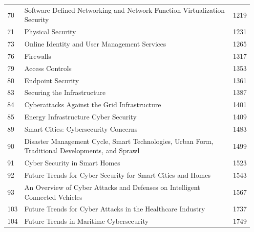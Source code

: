 \documentclass[10pt,letterpaper,oneside]{article}
\begin{document}
\begin{longtable}{@{}p{}p{}p{}@{}}
70 & Software-Defined Networking and Network Function Virtualization Security & 1219 \\
71 & Physical Security & 1231 \\
73 & Online Identity and User Management Services & 1265 \\
76 & Firewalls & 1317 \\
79 & Access Controls & 1353 \\
80 & Endpoint Security & 1361 \\
83 & Securing the Infrastructure & 1387 \\
84 & Cyberattacks Against the Grid Infrastructure & 1401 \\
85 & Energy Infrastructure Cyber Security & 1409 \\
89 & Smart Cities: Cybersecurity Concerns & 1483 \\
90 & Disaster Management Cycle, Smart Technologies, Urban Form, Traditional Developments, and Sprawl & 1499 \\
91 & Cyber Security in Smart Homes & 1523 \\
92 & Future Trends for Cyber Security for Smart Cities and Homes & 1543 \\
93 & An Overview of Cyber Attacks and Defenses on Intelligent Connected Vehicles & 1567 \\
103 & Future Trends for Cyber Attacks in the Healthcare Industry & 1737 \\
104 & Future Trends in Maritime Cybersecurity & 1749 \\
\bottomrule\end{longtable}\par\medskip
\end{document}
